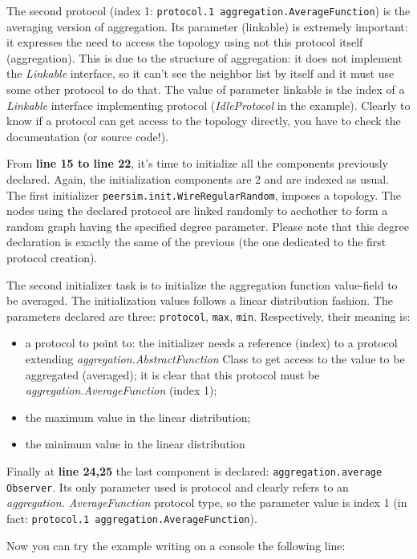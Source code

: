 \documentclass[a4paper,11pt]{article}
\begin{document}
The second protocol (index 1: \texttt{protocol.1 aggregation.AverageFunction})
is the averaging version of aggregation. Its parameter (linkable)
is extremely important: it expresses the need to access the topology
using not this protocol itself (aggregation). This is due to the structure
of aggregation: it does not implement the \emph{Linkable} interface,
so it can't see the neighbor list by itself and it must use some other
protocol to do that. The value of parameter linkable is the index
of a \emph{Linkable} interface implementing protocol (\emph{IdleProtocol}
in the example). Clearly to know if a protocol can get access to the
topology directly, you have to check the documentation (or source
code!).

From \textbf{line 15 to line 22}, it's time to initialize all the
components previously declared. Again, the initialization components
are 2 and are indexed as usual. The first initializer 
\texttt{peersim.init.WireRegularRandom},
imposes a topology. The nodes using the declared protocol are linked
randomly to aechother to form a random graph having the specified
degree parameter. Please note that this degree declaration is exactly
the same of the previous (the one dedicated to the first protocol
creation). 

The second initializer task is to initialize the aggregation function
value-field to be averaged. The initialization values follows a linear
distribution fashion. The parameters declared are three: \texttt{protocol},
\texttt{max}, \texttt{min}. Respectively, their meaning is:

\begin{itemize}
\item a protocol to point to: the initializer needs a reference (index)
to a protocol extending \emph{aggregation.AbstractFunction} Class
to get access to the value to be aggregated (averaged); it is clear
that this protocol must be \emph{aggregation.AverageFunction} (index
1);
\item the maximum value in the linear distribution; 
\item the minimum value in the linear distribution 
\end{itemize}
Finally at \textbf{line 24,25} the last component is declared: 
\texttt{aggregation.average Observer}.
Its only parameter used is protocol and clearly refers to an \emph{aggregation.
AverageFunction} protocol type, so the parameter value is index 1
(in fact: \texttt{protocol.1 aggregation.AverageFunction}). 

Now you can try the example writing on a console the following line:\\
\end{document}
